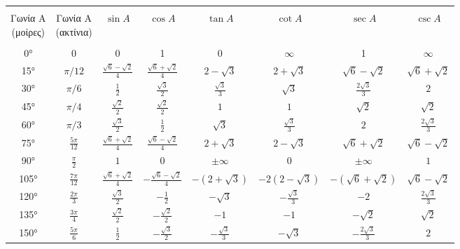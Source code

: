 \begin{table}
    \centering
\begin{tabular}{cccccccc}
    \toprule \\
    \minibox[c]{Γωνία Α \\ (μοίρες)} &  \minibox{Γωνία Α \\ (ακτίνια)} & $ \sin{A} $ & $ \cos{A} $ & $ \tan{A} $ &  $ \cot{A} $ & $ \sec{A} $ & $ \csc{A} $ \\
    \midrule \\
    \ang{0} & 0 & 0 & 1 & 0 & $\infty$ & 1 & $\infty$ \\
    \ang{15} & $ \pi / 12 $ & $ \frac{\sqrt{6} - \sqrt{2}}{4} $ & $ \frac{\sqrt{6} + \sqrt{2}}{4} $ & $ 2 - \sqrt{3} $ & $ 2 + \sqrt{3} $ & $ \sqrt{6} - \sqrt{2} $ & $ \sqrt{6} + \sqrt{2} $ \\
    \ang{30} & $ \pi / 6 $ & $ \frac{1}{2} $ & $ \frac{\sqrt{3}}{2} $ & $ \frac{\sqrt{3}}{3} $ & $ \sqrt{3} $ & $ \frac{2 \sqrt{3}}{3} $ & $2$ \\
    \ang{45} & $ \pi / 4 $ & $ \frac{\sqrt{2}}{2} $ & $ \frac{\sqrt{2}}{2} $ & $1$ & $1$ & $ \sqrt{2} $ & $ \sqrt{2} $ \\
    \ang{60} & $ \pi / 3 $ & $ \frac{\sqrt{3}}{2} $ & $ \frac{1}{2} $ & $ \sqrt{3} $ & $ \frac{\sqrt{3}}{3} $ & $ 2 $ & $ \frac{2 \sqrt{3}}{3} $ \\   
    \ang{75} & $ \frac{5 \pi}{12} $ & $ \frac{\sqrt{6} + \sqrt{2}}{4} $ & $ \frac{\sqrt{6} - \sqrt{2}}{4} $ & $ 2 + \sqrt{3} $ & $ 2 - \sqrt{3} $ & $ \sqrt{6} + \sqrt{2} $ &  $ \sqrt{6} - \sqrt{2} $ \\
    \ang{90} & $ \frac{\pi}{2} $ & $ 1 $ & $ 0 $ & $ \pm \infty $ & $ 0 $ & $ \pm \infty $ & $ 1 $ \\
    \ang{105} & $ \frac{7 \pi}{12} $ & $ \frac{\sqrt{6} + \sqrt{2}}{4} $ & $ - \frac{\sqrt{6} - \sqrt{2}}{4} $ &  $ -( 2 + \sqrt{3} ) $ & $ -2( 2 - \sqrt{3}) $ & $ -(\sqrt{6} + \sqrt{2}) $ & $ \sqrt{6} -
    \sqrt{2} $ \\
    \ang{120} & $ \frac{2 \pi}{3} $ & $ \frac{\sqrt{3}}{2} $ & $ - \frac{1}{2} $ & $ - \sqrt{3} $ & $ - \frac{\sqrt{3}}{3} $ & $ -2 $ & $ \frac{2 \sqrt{3}}{3} $ \\
    \ang{135} & $ \frac{3 \pi}{4} $ & $ \frac{\sqrt{2}}{2} $ & $ - \frac{\sqrt{2}}{2} $ & $ -1 $ & $ -1 $ & $ - \sqrt{2} $ & $ \sqrt{2} $ \\
    \ang{150} & $ \frac{5 \pi}{6} $ & $ \frac{1}{2} $ & $ - \frac{\sqrt{3}}{2} $ & $ - \frac{\sqrt{3}}{3} $ & $ - \sqrt{3} $ & $ - \frac{2 \sqrt{3}}{3} $ & $ 2 $ \\ 

\end{tabular}
\end{table}
